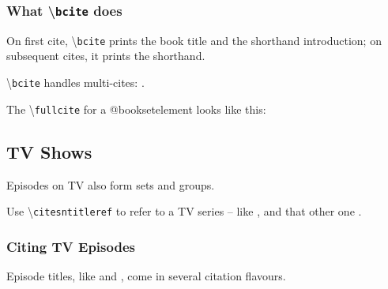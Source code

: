 \documentclass{article}
\newcommand\showcmnd[1]{%
\textbackslash\texttt{#1}%
}
\begin{document}

\subsubsection{What \showcmnd{bcite} does}
On first cite, \showcmnd{bcite} prints the book title and the shorthand introduction; on subsequent cites, it prints the shorthand.

\showcmnd{bcite} handles multi-cites: {\color{blue}}.

The \showcmnd{fullcite} for a @booksetelement looks like this:\\{\color{blue}}

\subsection{TV Shows}
Episodes on TV also form sets and groups.

Use \showcmnd{citesntitleref} to refer to a TV series -- like {\color{blue}}, and that other one {\color{blue}}.

\subsubsection{Citing TV Episodes}
Episode titles, like {\color{blue}} and {\color{blue}}, come in several citation flavours.
\end{document}
